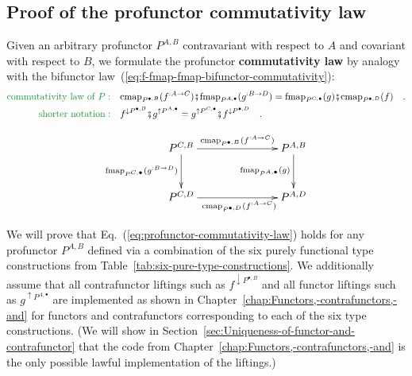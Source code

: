 \subsection{Proof of the profunctor commutativity law\label{subsec:Proof-of-the-profunctor-commutativity-law}}

Given an arbitrary profunctor $P^{A,B}$ contravariant with respect
to $A$ and covariant with respect to $B$, we formulate the profunctor
\textbf{commutativity law}
by analogy with the bifunctor law~(\ref{eq:f-fmap-fmap-bifunctor-commutativity}):
\begin{align}
{\color{greenunder}\text{commutativity law of }P:}\quad & \text{cmap}_{P^{\bullet,B}}(f^{:A\rightarrow C})\bef\text{fmap}_{P^{A,\bullet}}(g^{:B\rightarrow D})=\text{fmap}_{P^{C,\bullet}}(g)\bef\text{cmap}_{P^{\bullet,D}}(f)\quad.\nonumber \\
{\color{greenunder}\text{shorter notation}:}\quad & f^{\downarrow P^{\bullet,B}}\bef g^{\uparrow P^{A,\bullet}}=g^{\uparrow P^{C,\bullet}}\bef f^{\downarrow P^{\bullet,D}}\quad.\label{eq:profunctor-commutativity-law}
\end{align}

\begin{wrapfigure}{l}{0.43\columnwidth}%
\vspace{-1.7\baselineskip}
\[
\xymatrix{\xyScaleY{2.5pc}\xyScaleX{6.0pc}P^{C,B}\ar[r]\sp(0.55){\text{cmap}_{P^{\bullet,B}}(f^{:A\rightarrow C})~~~}\ar[d]\sb(0.45){\text{fmap}_{P^{C,\bullet}}(g^{:B\rightarrow D})} & P^{A,B}\ar[d]\sb(0.45){\text{fmap}_{P^{A,\bullet}}(g)}\\
P^{C,D}\ar[r]\sb(0.45){~~~~\text{cmap}_{P^{\bullet,D}}(f^{:A\rightarrow C})} & P^{A,D}
}
\]

\vspace{-1.7\baselineskip}
\end{wrapfigure}%

We will prove that Eq.~(\ref{eq:profunctor-commutativity-law}) holds
for any profunctor $P^{A,B}$ defined via a combination of the six
purely functional type constructions from Table~\ref{tab:six-pure-type-constructions}.
We additionally assume that all contrafunctor liftings such as $f^{\downarrow P^{\bullet,B}}$
and all functor liftings such as $g^{\uparrow P^{A,\bullet}}$ are
implemented as shown in Chapter~\ref{chap:Functors,-contrafunctors,-and}
for functors and contrafunctors corresponding to each of the six type
constructions. (We will show in Section~\ref{sec:Uniqueness-of-functor-and-contrafunctor}
that the code from Chapter~\ref{chap:Functors,-contrafunctors,-and}
is the only possible lawful implementation of the liftings.)

